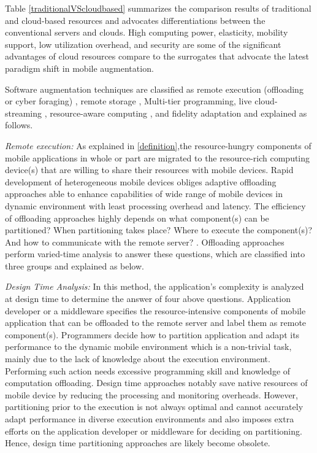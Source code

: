\documentclass[publish]{IEEEtran}
\begin{document}
Table \ref{traditionalVScloudbased} summarizes the comparison results of traditional and cloud-based resources and advocates differentiations between the conventional servers and clouds. High computing power, elasticity, mobility support, low utilization overhead, and security are some of the significant advantages of cloud resources compare to the surrogates that advocate the latest paradigm shift in mobile augmentation.

Software augmentation techniques are classified as remote execution (offloading or cyber foraging) \cite{Satyanarayanan2001,Rudenko1998a,cuervo2010maui,Flinn, Balan2002cyber, Balana, Flinnc, Goyal2004a, Su2005, Balan, Gu2003, Chuna, Kempa, Kemp2010, Chun2009, Kemp2010a, Kristensen2010, Zhang2011, Chun2011, Kosta2011,Fekete2012}, remote storage \cite{Park2003}, Multi-tier programming\cite{March2011,SAMI,MOMCC}, live cloud-streaming \cite{Lawton2012}, resource-aware computing \cite{Seshasayee2007, Hong2009a}, and fidelity adaptation \cite{Krishna2004} and explained as follows. 

\textbullet\textit{ Remote execution:} As explained in \ref{definition},the resource-hungry components of mobile applications \textemdash in whole or part \textemdash are migrated to the resource-rich computing device(s) that are willing to share their resources with mobile devices. Rapid development of heterogeneous mobile devices obliges adaptive offloading approaches able to enhance capabilities of wide range of mobile devices in dynamic environment with least processing overhead and latency. The efficiency of offloading approaches highly depends on what component(s) can be partitioned? When partitioning takes place? Where to execute the component(s)? And how to communicate with the remote server? \cite{Murarasu2009}. Offloading approaches perform varied-time analysis to answer these questions, which are classified into three groups and explained as below.

\textit{Design Time Analysis:} In this method, the application's complexity is analyzed at design time to determine the answer of four above questions. Application developer or a middleware specifies the resource-intensive components of mobile application that can be offloaded to the remote server and label them as remote component(s). Programmers decide how to partition application and adapt its performance to the dynamic mobile environment which is a non-trivial task, mainly due to the lack of knowledge about the execution environment. Performing such action needs excessive programming skill and knowledge of computation offloading. Design time approaches \cite{Balana,Balan2002cyber,Flinnc} notably save native resources of mobile device by reducing the processing and monitoring overheads. However, partitioning prior to the execution is not always optimal and cannot accurately adapt performance in diverse execution environments and also imposes extra efforts on the application developer or middleware for deciding on partitioning. Hence, design time partitioning approaches are likely become obsolete.
\end{document}
